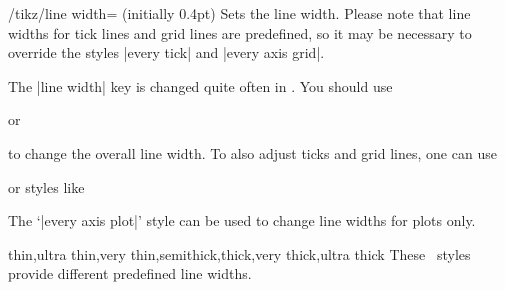 \begin{key}{/tikz/line width= (initially 0.4pt)}
	Sets the line width. Please note that line widths for tick lines and grid lines are predefined, so it may be necessary to override the styles |every tick| and |every axis grid|.

	The |line width| key is changed quite often in \Tikz. You should use
\begin{codeexample}
\end{codeexample}
	or
\begin{codeexample}
\end{codeexample}
	to change the overall line width. To also adjust ticks and grid lines, one can use
\begin{codeexample}
\end{codeexample}
	or styles like
\begin{codeexample}
\end{codeexample}
	The `|every axis plot|' style can be used to change line widths for plots only.
\end{key}

\begin{keylist}[/tikz]{thin,ultra thin,very thin,semithick,thick,very thick,ultra thick}
	These \Tikz\ styles provide different predefined line widths.
\end{keylist}

